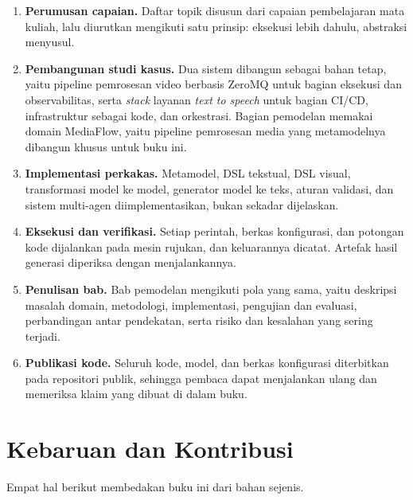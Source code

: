 \begin{enumerate}
  \item \textbf{Perumusan capaian.} Daftar topik disusun dari capaian
        pembelajaran mata kuliah, lalu diurutkan mengikuti satu prinsip:
        eksekusi lebih dahulu, abstraksi menyusul.
  \item \textbf{Pembangunan studi kasus.} Dua sistem dibangun sebagai bahan
        tetap, yaitu pipeline pemrosesan video berbasis ZeroMQ untuk bagian
        eksekusi dan observabilitas, serta \textit{stack} layanan \textit{text to
        speech} untuk bagian CI/CD, infrastruktur sebagai kode, dan orkestrasi.
        Bagian pemodelan memakai domain MediaFlow, yaitu pipeline pemrosesan
        media yang metamodelnya dibangun khusus untuk buku ini.
  \item \textbf{Implementasi perkakas.} Metamodel, DSL tekstual, DSL visual,
        transformasi model ke model, generator model ke teks, aturan validasi,
        dan sistem multi-agen diimplementasikan, bukan sekadar dijelaskan.
  \item \textbf{Eksekusi dan verifikasi.} Setiap perintah, berkas konfigurasi,
        dan potongan kode dijalankan pada mesin rujukan, dan keluarannya
        dicatat. Artefak hasil generasi diperiksa dengan menjalankannya.
  \item \textbf{Penulisan bab.} Bab pemodelan mengikuti pola yang sama, yaitu
        deskripsi masalah domain, metodologi, implementasi, pengujian dan
        evaluasi, perbandingan antar pendekatan, serta risiko dan kesalahan yang
        sering terjadi.
  \item \textbf{Publikasi kode.} Seluruh kode, model, dan berkas konfigurasi
        diterbitkan pada repositori publik, sehingga pembaca dapat menjalankan
        ulang dan memeriksa klaim yang dibuat di dalam buku.
\end{enumerate}

\section*{Kebaruan dan Kontribusi}

Empat hal berikut membedakan buku ini dari bahan sejenis.

